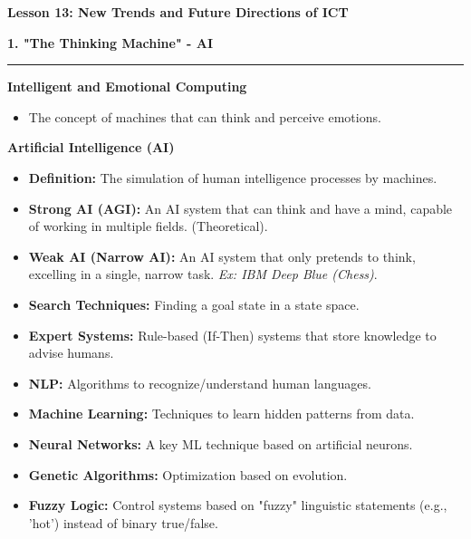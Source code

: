 \documentclass[a4paper, 8pt]{extarticle}
\newcommand{\sectionheading}[1]{\large\textbf{#1}\par\noindent\rule{\linewidth}{0.4pt}}
\newcommand{\subsectionheading}[1]{\normalsize\textbf{#1}}
\begin{document}
\pagestyle{empty} %

\begin{center}
    \fontsize{12pt}{14pt}\selectfont
    \textbf{Lesson 13: New Trends and Future Directions of ICT}
\end{center}
\vspace{1em}

\begin{multicols}{2}


\sectionheading{1. "The Thinking Machine" - AI}
\vspace{0.5em}
\subsectionheading{Intelligent and Emotional Computing}
\begin{itemize}
    \item The concept of machines that can think and perceive emotions.
\end{itemize}

\subsectionheading{Artificial Intelligence (AI)}
\begin{itemize}
    \item \textbf{Definition:} The simulation of human intelligence processes by machines.
    \item \textbf{Strong AI (AGI):} An AI system that can think and have a mind, capable of working in multiple fields. (Theoretical).
    \item \textbf{Weak AI (Narrow AI):} An AI system that only pretends to think, excelling in a single, narrow task. \textit{Ex: IBM Deep Blue (Chess)}.
\end{itemize}

\begin{tcolorbox}[title=\textbf{Key AI Techniques}]
    \begin{itemize}
        \item \textbf{Search Techniques:} Finding a goal state in a state space.
        \item \textbf{Expert Systems:} Rule-based (If-Then) systems that store knowledge to advise humans.
        \item \textbf{NLP:} Algorithms to recognize/understand human languages.
        \item \textbf{Machine Learning:} Techniques to learn hidden patterns from data.
        \item \textbf{Neural Networks:} A key ML technique based on artificial neurons.
        \item \textbf{Genetic Algorithms:} Optimization based on evolution.
        \item \textbf{Fuzzy Logic:} Control systems based on "fuzzy" linguistic statements (e.g., 'hot') instead of binary true/false.
    \end{itemize}
\end{tcolorbox}


\end{multicols}
\end{document}
